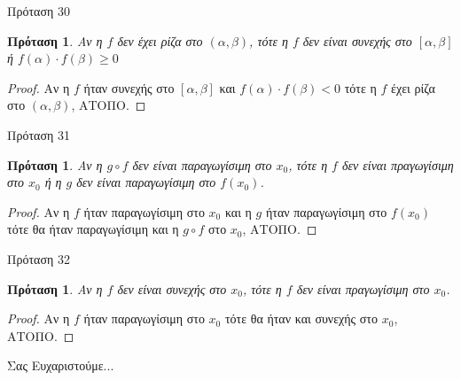 \documentclass[greek]{beamer}
\newtheorem{proposition}[theorem]{Πρόταση}
\begin{document}
\begin{frame}{Πρόταση 30}
 \begin{proposition}
  \normalfont Αν η $f$ δεν έχει ρίζα στο $\left( \alpha ,\beta  \right)$, τότε η $f$ δεν είναι συνεχής στο $\left[ \alpha ,\beta  \right]$ ή  $f\left( \alpha  \right)\cdot f\left( \beta  \right)\ge 0$
 \end{proposition}
 \begin{proof}
  Αν η $f$ ήταν συνεχής στο $\left[ \alpha ,\beta  \right]$ και $f\left( \alpha  \right)\cdot f\left( \beta  \right)<0$ τότε η $f$ έχει ρίζα στο $\left( \alpha ,\beta  \right)$, ΑΤΟΠΟ.
 \end{proof}
\end{frame}

\begin{frame}{Πρόταση 31}
 \begin{proposition}
  \normalfont Αν η $g\circ f$ δεν είναι παραγωγίσιμη στο ${{x}_{0}}$, τότε η $f$ δεν είναι πραγωγίσιμη στο ${{x}_{0}}$ ή η $g$ δεν είναι παραγωγίσιμη στο $f\left( {{x}_{0}} \right)$.
 \end{proposition}
 \begin{proof}
  Αν η $f$ ήταν παραγωγίσιμη στο ${{x}_{0}}$ και η $g$ ήταν παραγωγίσιμη στο $f\left( {{x}_{0}} \right)$ τότε θα ήταν παραγωγίσιμη και η $g\circ f$ στο ${{x}_{0}}$, ΑΤΟΠΟ.
 \end{proof}
\end{frame}

\begin{frame}{Πρόταση 32}
 \begin{proposition}
  \normalfont Αν η $f$ δεν είναι συνεχής στο ${{x}_{0}}$, τότε η $f$ δεν είναι πραγωγίσιμη στο ${{x}_{0}}$.
 \end{proposition}
 \begin{proof}
  Αν η $f$ ήταν παραγωγίσιμη στο ${{x}_{0}}$ τότε θα ήταν και συνεχής στο ${{x}_{0}}$, ΑΤΟΠΟ.
 \end{proof}
\end{frame}

\begin{frame}[plain,c]
 \begin{center}
  \Huge Σας Ευχαριστούμε...
 \end{center}
\end{frame}
\end{document}
